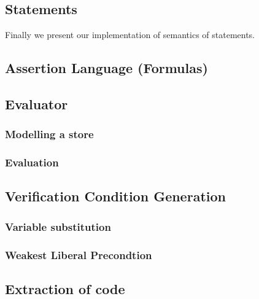 \subsection{Statements}
Finally we present our implementation of semantics of statements.



\subsection{Assertion Language (Formulas)}\label{sec:iformulas}


\subsection{Evaluator}\label{sec:evaluator}


\subsubsection{Modelling a store}


\subsubsection{Evaluation}


\subsection{Verification Condition Generation}\label{sec:vcg}


\subsubsection{Variable substitution}


\subsubsection{Weakest Liberal Precondtion}\label{sec:impwlp}


\subsection{Extraction of code}

